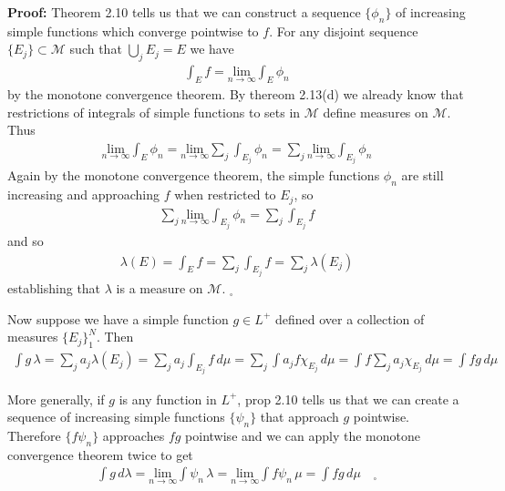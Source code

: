 \documentclass[11pt,letter]{article}
\begin{document}
\begin{enumerate}
    \textbf{Proof:} Theorem 2.10 tells us that we can construct a sequence $\{\phi_n\}$ of increasing simple functions which converge pointwise to $f$. For any disjoint sequence $\{E_j\} \subset \mathcal{M}$ such that $\bigcup_j{E_j} = E$ we have
    \begin{align*}
        \int_E f = \underset{n \rightarrow \infty}{\text{ lim }} \int_E \phi_n
    \end{align*}
    by the monotone convergence theorem. By thereom 2.13(d) we already know that restrictions of integrals of simple functions to sets in $\mathcal{M}$ define measures on $\mathcal{M}$. Thus
    \begin{align*}
        \underset{n \rightarrow \infty}{\text{ lim }} \int_E \phi_n = \underset{n \rightarrow \infty}{\text{ lim }} \sum_j \int_{E_j} \phi_n =  \sum_j \underset{n \rightarrow \infty}{\text{ lim }} \int_{E_j} \phi_n 
    \end{align*}
    Again by the monotone convergence theorem, the simple functions $\phi_n$ are still increasing and approaching $f$ when restricted to $E_j$, so
    \begin{align*}
        \sum_j \underset{n \rightarrow \infty}{\text{ lim }} \int_{E_j} \phi_n  = \sum_j \int_{E_j} f
    \end{align*}
    and so
    \begin{align*}
        \lambda(E) = \int_E f = \sum_j \int_{E_j} f = \sum_j \lambda(E_j)
    \end{align*}
    establishing that $\lambda$ is a measure on $\mathcal{M}$. $_\square$

    Now suppose we have a simple function $g \in L^+$ defined over a collection of measures $\{E_j\}_1^N$. Then
    \begin{align*}
        \int g\,\lambda = \sum_j a_j \lambda(E_j) = \sum_j a_j \int_{E_j} f\, d\mu = \sum_j \int a_j f\chi_{E_j}\, d\mu = \int f \sum_j a_j \chi_{E_j}\, d\mu = \int f g\,d\mu
    \end{align*}

    More generally, if $g$ is any function in $L^+$, prop 2.10 tells us that we can create a sequence of increasing simple functions $\{\psi_n\}$ that approach $g$ pointwise. Therefore $\{f \psi_n\}$ approaches $fg$ pointwise and we can apply the monotone convergence theorem twice to get
    \begin{align*}
        \int g\,d\lambda = \underset{n \rightarrow \infty}{\text{ lim }} \int \psi_n\,\lambda = \underset{n \rightarrow \infty}{\text{ lim }} \int f\psi_n\,\mu = \int fg\,d\mu \quad _\square 
    \end{align*}


\end{enumerate}
\end{document}
